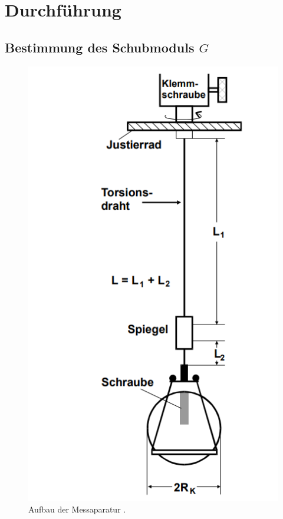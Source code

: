 \section{Durchführung}
\label{sec:Durchführung}
\subsection{Bestimmung des Schubmoduls $G$}
    \begin{figure}
        \centering
        \includegraphics[width=\textwidth]{content/aufbau.png}
        \caption{Aufbau der Messaparatur \cite[100]{V102}.}
        \label{fig:aufbau}
    \end{figure}
